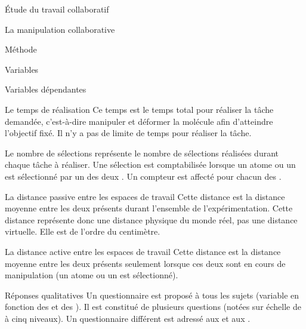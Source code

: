 \documentclass[myfrancais]{mythesis}
\begin{document}
\begin{mypart}{Étude du travail collaboratif}
\begin{mychapter}{La manipulation collaborative}
\begin{mysection}{Méthode}
\begin{mysubsection}{Variables}
\begin{mysubsubsection}{Variables dépendantes}
\begin{myparagraph}{ Le temps de réalisation}
							Ce temps est le temps total pour réaliser la tâche demandée, c'est-à-dire manipuler et déformer la molécule afin d'atteindre l'objectif fixé.
							Il n'y a pas de limite de temps pour réaliser la tâche.
						\end{myparagraph}
						\begin{myparagraph}{ Le nombre de sélections}
							 représente le nombre de sélections réalisées durant chaque tâche à réaliser.
							Une sélection est comptabilisée lorsque un atome ou un  est sélectionné par un des deux .
							Un compteur est affecté pour chacun des .
						\end{myparagraph}
						\begin{myparagraph}{ La distance passive entre les espaces de travail}
							Cette distance est la distance moyenne entre les deux  présents durant l'ensemble de l'expérimentation.
							Cette distance représente donc une distance physique du monde réel, pas une distance virtuelle.
							Elle est de l'ordre du centimètre.
						\end{myparagraph}
						\begin{myparagraph}{ La distance active entre les espaces de travail}
							Cette distance est la distance moyenne entre les deux  présents seulement lorsque ces deux  sont en cours de manipulation (un atome ou un  est sélectionné).
						\end{myparagraph}
						\begin{myparagraph}{ Réponses qualitatives}
							Un questionnaire est proposé à tous les sujets (variable en fonction des  et des ).
							Il est constitué de plusieurs questions (notées sur échelle de  à cinq niveaux).
							Un questionnaire différent est adressé aux  et aux .


\end{myparagraph}
\end{mysubsubsection}
\end{mysubsection}
\end{mysection}
\end{mychapter}
\end{mypart}
\end{document}
